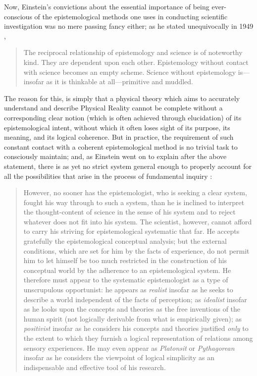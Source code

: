 Now, Einstein's convictions about the essential importance of being ever-conscious of the epistemological methods one uses in conducting scientific investigation was no mere passing fancy either; as he stated unequivocally in 1949 \cite{Einstein1951},
\begin{quotation}
The reciprocal relationship of epistemology and science is of noteworthy kind. They are dependent upon each other. Epistemology without contact with science becomes an empty scheme. Science without epistemology is---insofar as it is thinkable at all---primitive and muddled. 
\end{quotation}
The reason for this, is simply that a physical theory which aims to accurately understand and describe Physical Reality cannot be complete without a corresponding clear notion (which is often achieved through elucidation) of its epistemological intent, without which it often loses sight of its purpose, its meaning, and its logical coherence. But in practice, the requirement of such constant contact with a coherent epistemological method is no trivial task to consciously maintain; and, as Einstein went on to explain after the above statement, there is as yet no strict system general enough to properly account for all the possibilities that arise in the process of fundamental inquiry \cite{Einstein1951}:
\begin{quote}
However, no sooner has the epistemologist, who is seeking a clear system, fought his way through to such a system, than he is inclined to interpret the thought-content of science in the sense of his system and to reject whatever does not fit into his system. The scientist, however, cannot afford to carry his striving for epistemological systematic that far. He accepts gratefully the epistemological conceptual analysis; but the external conditions, which are set for him by the facts of experience, do not permit him to let himself be too much restricted in the construction of his conceptual world by the adherence to an epistemological system. He therefore must appear to the systematic epistemologist as a type of unscrupulous opportunist: he appears as \textit{realist} insofar as he seeks to describe a world independent of the facts of perception; as \textit{idealist} insofar as he looks upon the concepts and theories as the free inventions of the human spirit (not logically derivable from what is empirically given); as \textit{positivist} insofar as he considers his concepts and theories justified \textit{only} to the extent to which they furnish a logical representation of relations among sensory experiences. He may even appear as \textit{Platonsit} or \textit{Pythagorean} insofar as he considers the viewpoint of logical simplicity as an indispensable and effective tool of his research.
\end{quote}

